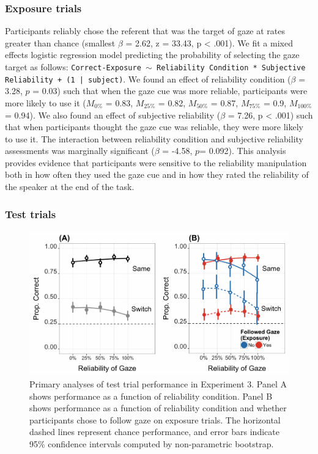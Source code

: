\documentclass[authoryear, review]{elsarticle}
\newenvironment{CodeChunk}{}{}
\begin{document}
\subsubsection{Exposure trials}\label{exposure-trials-2}

Participants reliably chose the referent that was the target of gaze at
rates greater than chance (smallest \(\beta\) = 2.62, z = 33.43, p
\textless{} .001). We fit a mixed effects logistic regression model
predicting the probability of selecting the gaze target as follows:
\texttt{Correct-Exposure $\sim$ Reliability Condition * Subjective Reliability + (1 | subject)}.
We found an effect of reliability condition (\(\beta\) = 3.28, \(p\) =
0.03) such that when the gaze cue was more reliable, participants were
more likely to use it (\(M_{0\%}\) = 0.83, \(M_{25\%}\) = 0.82,
\(M_{50\%}\) = 0.87, \(M_{75\%}\) = 0.9, \(M_{100\%}\) = 0.94). We also
found an effect of subjective reliability (\(\beta\) = 7.26, p
\textless{} .001) such that when participants thought the gaze cue was
reliable, they were more likely to use it. The interaction between
reliability condition and subjective reliability assessments was
marginally significant (\(\beta\) = -4.58, \(p\)= 0.092). This analysis
provides evidence that participants were sensitive to the reliability
manipulation both in how often they used the gaze cue and in how they
rated the reliability of the speaker at the end of the task.

\subsubsection{Test trials}\label{test-trials-2}

\begin{CodeChunk}
\begin{figure}[tb]

{\centering \includegraphics[width=0.9\linewidth]{figs/e3-plot-1} 

}

\caption[Primary analyses of test trial performance in Experiment 3]{Primary analyses of test trial performance in Experiment 3. Panel A shows performance as a function of reliability condition. Panel B shows performance as a function of reliability condition and whether participants chose to follow gaze on exposure trials. The horizontal dashed lines represent chance performance, and error bars indicate 95\% confidence intervals computed by non-parametric bootstrap.}\label{fig:e3-plot}
\end{figure}
\end{CodeChunk}
\end{document}
